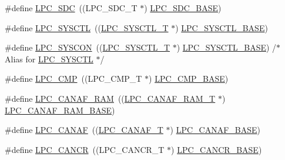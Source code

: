 \begin{DoxyCompactItemize}
\item 
\#define \hyperlink{group__PERIPH__407X__8X__BASE_ga3914f06f63d5e9e9156865b86956bca8}{L\-P\-C\-\_\-\-S\-D\-C}~((L\-P\-C\-\_\-\-S\-D\-C\-\_\-\-T              $\ast$) \hyperlink{group__PERIPH__407X__8X__BASE_gab8f044e5911a6bf51879e4614bf2a0a3}{L\-P\-C\-\_\-\-S\-D\-C\-\_\-\-B\-A\-S\-E})
\item 
\#define \hyperlink{group__PERIPH__407X__8X__BASE_ga30cc92eba86b30295b3dcf3da503b736}{L\-P\-C\-\_\-\-S\-Y\-S\-C\-T\-L}~((\hyperlink{structLPC__SYSCTL__T}{L\-P\-C\-\_\-\-S\-Y\-S\-C\-T\-L\-\_\-\-T}           $\ast$) \hyperlink{group__PERIPH__407X__8X__BASE_gae4670b50fe27772fa31de1da10bec7b7}{L\-P\-C\-\_\-\-S\-Y\-S\-C\-T\-L\-\_\-\-B\-A\-S\-E})
\item 
\#define \hyperlink{group__PERIPH__407X__8X__BASE_gabe45c10a979fe812e3d9ecd72fe33a2f}{L\-P\-C\-\_\-\-S\-Y\-S\-C\-O\-N}~((\hyperlink{structLPC__SYSCTL__T}{L\-P\-C\-\_\-\-S\-Y\-S\-C\-T\-L\-\_\-\-T}           $\ast$) \hyperlink{group__PERIPH__407X__8X__BASE_gae4670b50fe27772fa31de1da10bec7b7}{L\-P\-C\-\_\-\-S\-Y\-S\-C\-T\-L\-\_\-\-B\-A\-S\-E}) /$\ast$ Alias for \hyperlink{group__PERIPH__407X__8X__BASE_ga30cc92eba86b30295b3dcf3da503b736}{L\-P\-C\-\_\-\-S\-Y\-S\-C\-T\-L} $\ast$/
\item 
\#define \hyperlink{group__PERIPH__407X__8X__BASE_gabc29cea39fbacdfa61a79b4c082e68ad}{L\-P\-C\-\_\-\-C\-M\-P}~((L\-P\-C\-\_\-\-C\-M\-P\-\_\-\-T              $\ast$) \hyperlink{group__PERIPH__407X__8X__BASE_ga571228b687abe77c6e72bdbe00cf60a3}{L\-P\-C\-\_\-\-C\-M\-P\-\_\-\-B\-A\-S\-E})
\item 
\#define \hyperlink{group__PERIPH__407X__8X__BASE_gaf02b7bcdc41a045910b3f0bae8a8f4b0}{L\-P\-C\-\_\-\-C\-A\-N\-A\-F\-\_\-\-R\-A\-M}~((\hyperlink{structLPC__CANAF__RAM__T}{L\-P\-C\-\_\-\-C\-A\-N\-A\-F\-\_\-\-R\-A\-M\-\_\-\-T}        $\ast$) \hyperlink{group__PERIPH__407X__8X__BASE_ga9d4f2bac61e26b32ad64d62f2be50e49}{L\-P\-C\-\_\-\-C\-A\-N\-A\-F\-\_\-\-R\-A\-M\-\_\-\-B\-A\-S\-E})
\item 
\#define \hyperlink{group__PERIPH__407X__8X__BASE_ga4f738c971938302f38d54e662c9f7774}{L\-P\-C\-\_\-\-C\-A\-N\-A\-F}~((\hyperlink{structLPC__CANAF__T}{L\-P\-C\-\_\-\-C\-A\-N\-A\-F\-\_\-\-T}            $\ast$) \hyperlink{group__PERIPH__407X__8X__BASE_gabc6943f9e943d63ecf4e236b4ce7c344}{L\-P\-C\-\_\-\-C\-A\-N\-A\-F\-\_\-\-B\-A\-S\-E})
\item 
\#define \hyperlink{group__PERIPH__407X__8X__BASE_gadc209557a5736e29149b96018056fc29}{L\-P\-C\-\_\-\-C\-A\-N\-C\-R}~((L\-P\-C\-\_\-\-C\-A\-N\-C\-R\-\_\-\-T            $\ast$) \hyperlink{group__PERIPH__407X__8X__BASE_gac22b88e108d620661add143c174f8f11}{L\-P\-C\-\_\-\-C\-A\-N\-C\-R\-\_\-\-B\-A\-S\-E})

\end{DoxyCompactItemize}
